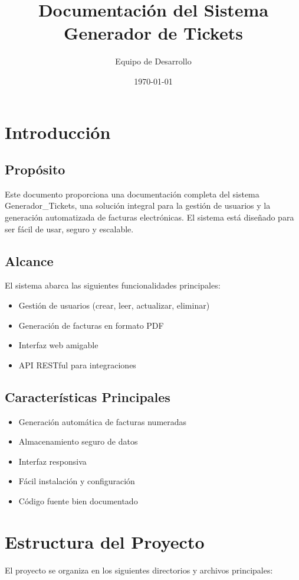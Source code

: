 \documentclass{article}
\title{Documentación del Sistema Generador de Tickets}
\author{Equipo de Desarrollo}
\date{\today}
\begin{document}
\maketitle
\tableofcontents
\newpage

\section{Introducción}
\subsection{Propósito}
Este documento proporciona una documentación completa del sistema Generador\_Tickets, una solución integral para la gestión de usuarios y la generación automatizada de facturas electrónicas. El sistema está diseñado para ser fácil de usar, seguro y escalable.

\subsection{Alcance}
El sistema abarca las siguientes funcionalidades principales:
\begin{itemize}
    \item Gestión de usuarios (crear, leer, actualizar, eliminar)
    \item Generación de facturas en formato PDF
    \item Interfaz web amigable
    \item API RESTful para integraciones
\end{itemize}

\subsection{Características Principales}
\begin{itemize}
    \item Generación automática de facturas numeradas
    \item Almacenamiento seguro de datos
    \item Interfaz responsiva
    \item Fácil instalación y configuración
    \item Código fuente bien documentado
\end{itemize}

\section{Estructura del Proyecto}
El proyecto se organiza en los siguientes directorios y archivos principales:
\end{document}
